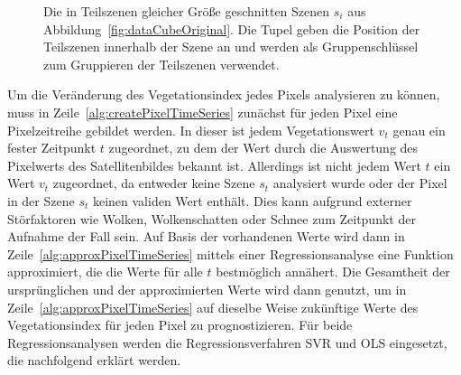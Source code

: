 \begin{figure}[H]
\centering

\caption{Die in Teilszenen gleicher Größe geschnitten Szenen \(s_i\) aus Abbildung~\ref{fig:dataCubeOriginal}. Die Tupel geben die Position der Teilszenen innerhalb der Szene an und werden als Gruppenschlüssel zum Gruppieren der Teilszenen verwendet.} 
\label{fig:dataCubeSliced}
\end{figure}

Um die Veränderung des Vegetationsindex jedes Pixels analysieren zu können, muss in Zeile~\ref{alg:createPixelTimeSeries} zunächst für jeden Pixel eine Pixelzeitreihe gebildet werden. In dieser ist jedem Vegetationswert \(v_t\) genau ein fester Zeitpunkt \(t\) zugeordnet, zu dem der Wert durch die Auswertung des Pixelwerts des Satellitenbildes bekannt ist. Allerdings ist nicht jedem Wert \(t\) ein Wert \(v_t\) zugeordnet, da entweder keine Szene \(s_t\) analysiert wurde oder der Pixel in der Szene \(s_t\) keinen validen Wert enthält. Dies kann aufgrund externer Störfaktoren wie Wolken, Wolkenschatten oder Schnee zum Zeitpunkt der Aufnahme der Fall sein. Auf Basis der vorhandenen Werte wird dann in Zeile~\ref{alg:approxPixelTimeSeries} mittels einer Regressionsanalyse eine Funktion approximiert, die die Werte für alle \(t\) bestmöglich annähert.
Die Gesamtheit der ursprünglichen und der approximierten Werte wird dann genutzt, um in Zeile~\ref{alg:approxPixelTimeSeries} auf dieselbe Weise zukünftige Werte des Vegetationsindex für jeden Pixel zu prognostizieren. Für beide Regressionsanalysen werden die Regressionsverfahren SVR und OLS eingesetzt, die nachfolgend erklärt werden. \\

